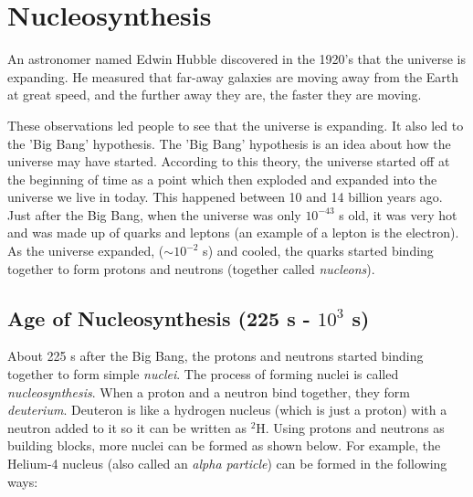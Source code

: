 



\section{Nucleosynthesis}
An astronomer named Edwin Hubble discovered in the 1920's that the universe is expanding. He measured that far-away galaxies are moving away from the Earth at great speed, and the further away they are, the faster they are moving.


These observations led people to see that the universe is expanding. It also led to the 'Big Bang' hypothesis. The 'Big Bang' hypothesis is an idea about how the universe may have started. According to this theory, the universe started off at the beginning of time as a point which then exploded and expanded into the universe we live in today. This happened between 10 and 14 billion years ago.\\

Just after the Big Bang, when the universe was only $10^{-43}$ s old, it was very hot and was made up of quarks and leptons (an example of a lepton is the electron). As the universe expanded, ($\sim10^{-2}$ s) and cooled, the quarks started binding together to form protons and neutrons (together called \emph{nucleons}).

\subsection{Age of Nucleosynthesis (225 s - $10^{3}$ s)}
About 225 s after the Big Bang, the protons and neutrons started binding together to form simple \emph{nuclei}. The process of forming nuclei is called \emph{nucleosynthesis}. When a proton and a neutron bind together, they form \emph{deuterium}. Deuteron is like a hydrogen nucleus (which is just a proton) with a neutron added to it so it can be written as $^{2}\text{H}$. Using protons and neutrons as building blocks, more nuclei can be formed as shown below. For example, the Helium-4 nucleus (also called an \emph{alpha particle}) can be formed in the following ways:

